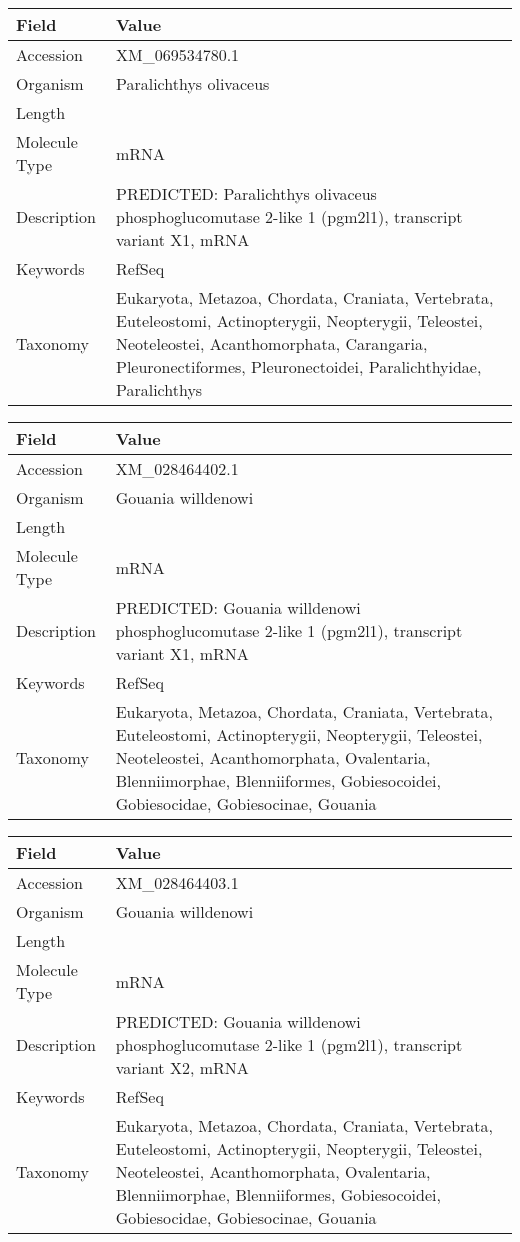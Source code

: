 \documentclass[10pt]{article}
\begin{document}
{\footnotesize
\begin{longtable}{>{\raggedright\arraybackslash}p{4.5cm} >{\raggedright\arraybackslash}p{11.5cm}}
\textbf{Field} & \textbf{Value} \\
\hline
Accession & XM\_069534780.1 \\
Organism & Paralichthys olivaceus \\
Length & 3191 \\
Molecule Type & mRNA \\
Description & PREDICTED: Paralichthys olivaceus phosphoglucomutase 2-like 1 (pgm2l1), transcript variant X1, mRNA \\
Keywords & RefSeq \\
Taxonomy & Eukaryota, Metazoa, Chordata, Craniata, Vertebrata, Euteleostomi, Actinopterygii, Neopterygii, Teleostei, Neoteleostei, Acanthomorphata, Carangaria, Pleuronectiformes, Pleuronectoidei, Paralichthyidae, Paralichthys \\
\end{longtable}
}

{\footnotesize
\begin{longtable}{>{\raggedright\arraybackslash}p{4.5cm} >{\raggedright\arraybackslash}p{11.5cm}}
\textbf{Field} & \textbf{Value} \\
\hline
Accession & XM\_028464402.1 \\
Organism & Gouania willdenowi \\
Length & 2323 \\
Molecule Type & mRNA \\
Description & PREDICTED: Gouania willdenowi phosphoglucomutase 2-like 1 (pgm2l1), transcript variant X1, mRNA \\
Keywords & RefSeq \\
Taxonomy & Eukaryota, Metazoa, Chordata, Craniata, Vertebrata, Euteleostomi, Actinopterygii, Neopterygii, Teleostei, Neoteleostei, Acanthomorphata, Ovalentaria, Blenniimorphae, Blenniiformes, Gobiesocoidei, Gobiesocidae, Gobiesocinae, Gouania \\
\end{longtable}
}

{\footnotesize
\begin{longtable}{>{\raggedright\arraybackslash}p{4.5cm} >{\raggedright\arraybackslash}p{11.5cm}}
\textbf{Field} & \textbf{Value} \\
\hline
Accession & XM\_028464403.1 \\
Organism & Gouania willdenowi \\
Length & 2322 \\
Molecule Type & mRNA \\
Description & PREDICTED: Gouania willdenowi phosphoglucomutase 2-like 1 (pgm2l1), transcript variant X2, mRNA \\
Keywords & RefSeq \\
Taxonomy & Eukaryota, Metazoa, Chordata, Craniata, Vertebrata, Euteleostomi, Actinopterygii, Neopterygii, Teleostei, Neoteleostei, Acanthomorphata, Ovalentaria, Blenniimorphae, Blenniiformes, Gobiesocoidei, Gobiesocidae, Gobiesocinae, Gouania \\
\end{longtable}
}
\end{document}
